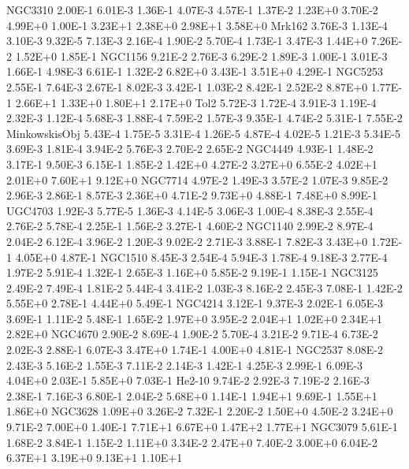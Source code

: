         NGC3310   2.00E-1  6.01E-3   1.36E-1  4.07E-3   4.57E-1  1.37E-2   1.23E+0  3.70E-2   4.99E+0  1.00E-1   3.23E+1  2.38E+0   2.98E+1  3.58E+0 
         Mrk162   3.76E-3  1.13E-4   3.10E-3  9.32E-5   7.13E-3  2.16E-4   1.90E-2  5.70E-4   1.73E-1  3.47E-3   1.44E+0  7.26E-2   1.52E+0  1.85E-1 
        NGC1156   9.21E-2  2.76E-3   6.29E-2  1.89E-3   1.00E-1  3.01E-3   1.66E-1  4.98E-3   6.61E-1  1.32E-2   6.82E+0  3.43E-1   3.51E+0  4.29E-1 
        NGC5253   2.55E-1  7.64E-3   2.67E-1  8.02E-3   3.42E-1  1.03E-2   8.42E-1  2.52E-2   8.87E+0  1.77E-1   2.66E+1  1.33E+0   1.80E+1  2.17E+0 
           Tol2   5.72E-3  1.72E-4   3.91E-3  1.19E-4   2.32E-3  1.12E-4   5.68E-3  1.88E-4   7.59E-2  1.57E-3   9.35E-1  4.74E-2   5.31E-1  7.55E-2 
  MinkowskisObj   5.43E-4  1.75E-5   3.31E-4  1.26E-5   4.87E-4  4.02E-5   1.21E-3  5.34E-5   3.69E-3  1.81E-4   3.94E-2  5.76E-3   2.70E-2  2.65E-2 
        NGC4449   4.93E-1  1.48E-2   3.17E-1  9.50E-3   6.15E-1  1.85E-2   1.42E+0  4.27E-2   3.27E+0  6.55E-2   4.02E+1  2.01E+0   7.60E+1  9.12E+0 
        NGC7714   4.97E-2  1.49E-3   3.57E-2  1.07E-3   9.85E-2  2.96E-3   2.86E-1  8.57E-3   2.36E+0  4.71E-2   9.73E+0  4.88E-1   7.48E+0  8.99E-1 
        UGC4703   1.92E-3  5.77E-5   1.36E-3  4.14E-5   3.06E-3  1.00E-4   8.38E-3  2.55E-4   2.76E-2  5.78E-4   2.25E-1  1.56E-2   3.27E-1  4.60E-2 
        NGC1140   2.99E-2  8.97E-4   2.04E-2  6.12E-4   3.96E-2  1.20E-3   9.02E-2  2.71E-3   3.88E-1  7.82E-3   3.43E+0  1.72E-1   4.05E+0  4.87E-1 
        NGC1510   8.45E-3  2.54E-4   5.94E-3  1.78E-4   9.18E-3  2.77E-4   1.97E-2  5.91E-4   1.32E-1  2.65E-3   1.16E+0  5.85E-2   9.19E-1  1.15E-1 
        NGC3125   2.49E-2  7.49E-4   1.81E-2  5.44E-4   3.41E-2  1.03E-3   8.16E-2  2.45E-3   7.08E-1  1.42E-2   5.55E+0  2.78E-1   4.44E+0  5.49E-1 
        NGC4214   3.12E-1  9.37E-3   2.02E-1  6.05E-3   3.69E-1  1.11E-2   5.48E-1  1.65E-2   1.97E+0  3.95E-2   2.04E+1  1.02E+0   2.34E+1  2.82E+0 
        NGC4670   2.90E-2  8.69E-4   1.90E-2  5.70E-4   3.21E-2  9.71E-4   6.73E-2  2.02E-3   2.88E-1  6.07E-3   3.47E+0  1.74E-1   4.00E+0  4.81E-1 
        NGC2537   8.08E-2  2.43E-3   5.16E-2  1.55E-3   7.11E-2  2.14E-3   1.42E-1  4.25E-3   2.99E-1  6.09E-3   4.04E+0  2.03E-1   5.85E+0  7.03E-1 
         He2-10   9.74E-2  2.92E-3   7.19E-2  2.16E-3   2.38E-1  7.16E-3   6.80E-1  2.04E-2   5.68E+0  1.14E-1   1.94E+1  9.69E-1   1.55E+1  1.86E+0 
        NGC3628   1.09E+0  3.26E-2   7.32E-1  2.20E-2   1.50E+0  4.50E-2   3.24E+0  9.71E-2   7.00E+0  1.40E-1   7.71E+1  6.67E+0   1.47E+2  1.77E+1 
        NGC3079   5.61E-1  1.68E-2   3.84E-1  1.15E-2   1.11E+0  3.34E-2   2.47E+0  7.40E-2   3.00E+0  6.04E-2   6.37E+1  3.19E+0   9.13E+1  1.10E+1 
